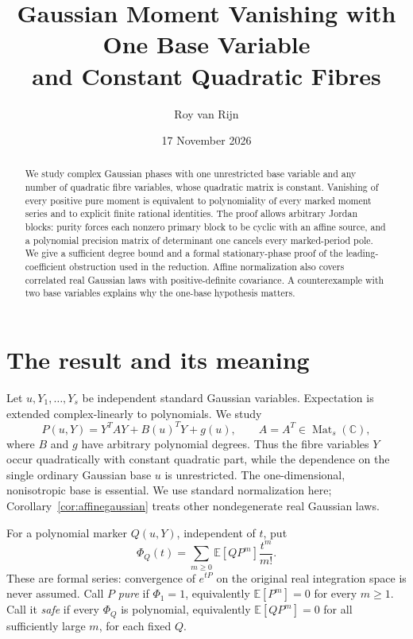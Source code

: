 \documentclass[11pt]{article}
\title{Gaussian Moment Vanishing with One Base Variable\\and Constant Quadratic Fibres}
\author{Roy van Rijn}\date{17 November 2026}
\theoremstyle{definition}\newtheorem{definition}[theorem]{Definition}
\theoremstyle{remark}\newtheorem{remark}[theorem]{Remark}
\newcommand{\E}{\mathbb E}
\newcommand{\C}{\mathbb C}
\begin{document}
\maketitle

\begin{abstract}
We study complex Gaussian phases with one unrestricted base variable and
any number of quadratic fibre variables, whose quadratic matrix is
constant. Vanishing of every positive pure moment is equivalent to
polynomiality of every marked moment series and to explicit finite
rational identities. The proof allows arbitrary Jordan blocks: purity
forces each nonzero primary block to be cyclic with an affine source,
and a polynomial precision matrix of determinant one cancels every
marked-period pole. We give a sufficient degree bound and a formal
stationary-phase proof of the leading-coefficient obstruction used in
the reduction. Affine normalization also covers correlated real Gaussian
laws with positive-definite covariance. A counterexample with two base
variables explains why the one-base hypothesis matters.
\end{abstract}

\section{The result and its meaning}

Let $u,Y_1,\ldots,Y_s$ be independent standard Gaussian variables.
Expectation is extended complex-linearly to polynomials. We study
\[
 P(u,Y)=Y^TAY+B(u)^TY+g(u),\qquad A=A^T\in\operatorname{Mat}_s(\C),
\]
where $B$ and $g$ have arbitrary polynomial degrees. Thus the fibre
variables $Y$ occur quadratically with constant quadratic part,
while the dependence on the single ordinary Gaussian base $u$ is
unrestricted. The one-dimensional, nonisotropic base is essential. We use standard
normalization here; Corollary~\ref{cor:affinegaussian} treats other
nondegenerate real Gaussian laws.

For a polynomial marker $Q(u,Y)$, independent of $t$, put
\[
 \Phi_Q(t)=\sum_{m\ge0}\E[QP^m]\frac{t^m}{m!}.
\]
These are formal series: convergence of $e^{tP}$ on the original
real integration space is never assumed. Call $P$ \emph{pure} if
$\Phi_1=1$, equivalently $\E[P^m]=0$ for every $m\ge1$. Call it
\emph{safe} if every $\Phi_Q$ is polynomial, equivalently
$\E[QP^m]=0$ for all sufficiently large $m$, for each fixed $Q$.
\end{document}
